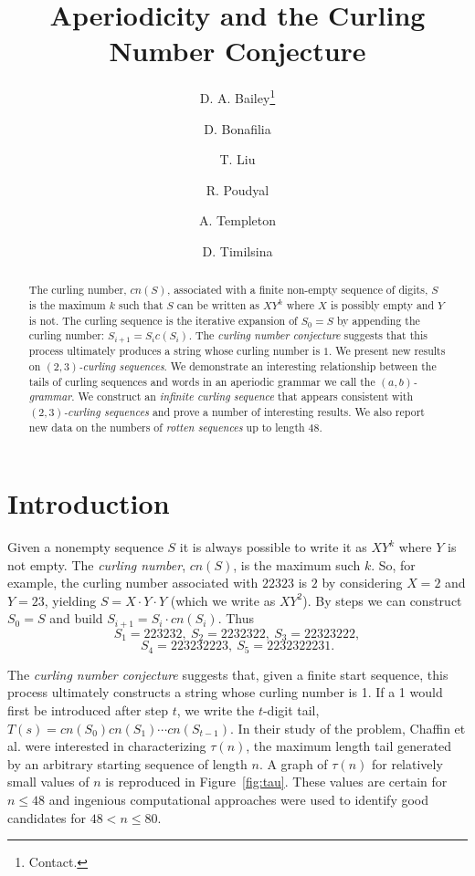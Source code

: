 \documentclass[11pt]{article}
\def\emph#1{{\em #1\/}}
\def\term#1{\emph{#1}}
\def\tail#1{{\tau(#1)}}
\def\ab{$(a,b)$}
\def\twth{$(2,3)$}
\def\abg{\ab-grammar}
\begin{document}
\title{Aperiodicity and the Curling Number Conjecture}
\author{D. A. Bailey\thanks{Contact.}\and D. Bonafilia\and T. Liu\and R. Poudyal\and A. Templeton\and D. Timilsina}
\maketitle

\begin{abstract}
The curling number, $cn(S)$, associated with a finite non-empty sequence of
digits, $S$ is the maximum $k$ such that $S$ can be written as $XY^k$ where $X$
is possibly empty and $Y$ is not.  The curling sequence is the iterative
expansion of $S_0=S$ by appending the curling number: $S_{i+1}=S_ic(S_i)$.  
The \term{curling number conjecture} suggests that this process ultimately
produces a string whose curling number is $1$.  We present new results on
\term{\twth-curling sequences}.  We demonstrate an interesting relationship
between the tails of curling sequences and words in an aperiodic grammar we
call the \term{\abg}.  We construct an \term{infinite curling sequence}
that appears consistent with \term{\twth-curling sequences} and prove a number
of interesting results.  We also report new data on the numbers of
\term{rotten sequences} up to length $48$.
\end{abstract}

\section{Introduction}
 Given a nonempty sequence $S$ it is always possible to write it as $XY^k$
where $Y$ is not empty.  The \term{curling number}, $cn(S)$, is the maximum
such $k$.  So, for example, the curling number associated with $2 2 3 2 3$ is $2$ by considering $X=2$ and $Y=2 3$, yielding $S=X\cdot Y\cdot Y$ (which we
write as $XY^2$).  By steps we can construct $S_0=S$ and build $S_{i+1}=S_i\cdot cn(S_i)$.  Thus $$S_1=2 2 3 2 3 2,~S_2=2 2 3 2 3 2 2,~S_3=2 2 3 2 3 2 2 2,$$ $$S_4=2 2 3 2 3 2 2 2 3,~S_5=2 2 3 2 3 2 2 2 3 1.$$

The \term{curling number conjecture} suggests that, given a finite start
sequence, this process ultimately constructs a string whose curling number is
1.  If a 1 would first be introduced after step $t$, we write the $t$-digit
tail, $T(s)=cn(S_0)cn(S_1)\cdots cn(S_{t-1})$.  In their study of the problem,
Chaffin et al.\cite{Ch13} were interested in characterizing $\tail{n}$, the maximum
length tail generated by an arbitrary starting sequence of length $n$.
A graph of $\tail{n}$ for relatively small values of $n$ is reproduced in
Figure~\ref{fig:tau}.  These values are certain for $n\le 48$ and ingenious
computational approaches were used to identify good candidates for $48<n\le 80$.
\end{document}
